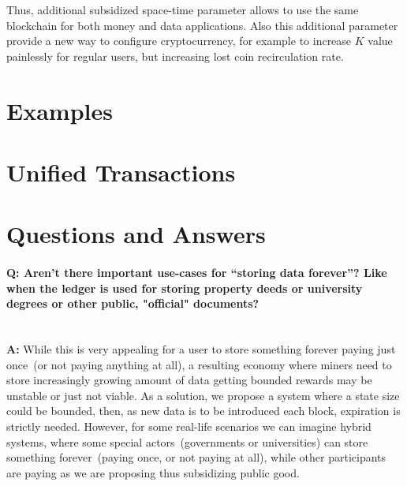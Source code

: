 \documentclass[]{llncs}   %
\newcommand{\authnote}[2]{\marginpar{\parbox{\marginparwidth}{\tiny %
  \textsf{#1 {\textcolor{blue}{notes: #2}}}}}%
  \textcolor{blue}{\textbf{\dag}}}
\newcommand{\authnote}[2]{
  \textsf{#1 \textcolor{blue}{: #2}}}
\newcommand{\authnote}[2]{}
\newcommand{\knote}[1]{{\authnote{\textcolor{green}{Alex notes}}{#1}}}
\begin{document}
Thus, additional subsidized space-time parameter allows to use the same blockchain for both money and data applications. Also this additional parameter provide a new way to configure cryptocurrency, for example to increase $K$ value painlessly for regular users, but increasing lost coin recirculation rate.

\section{Examples}

\knote{moneychain and datachain}

\section{Unified Transactions}

\knote{We can throw away specially coinbase transactions getting unified transaction format, by requiring fees to be paid in form of anyone-can-spend output, and by creating constant rewards in predefined and hard-coded pre-genesis state, where a reward for a certain height is an output in the pre-genesis UTXO spendable only at this height.}

\section{Questions and Answers}


\paragraph{\textbf{Q: } Aren't there important use-cases for ``storing data forever''? Like when the ledger is used for storing property deeds or university degrees or other public, "official" documents?}~\\
\textbf{A: } While this is very appealing for a user to store something forever paying just once~(or not paying anything at all), a resulting economy where miners need to store increasingly growing amount of data getting bounded rewards may be unstable or just not viable. As a solution, we propose a system where a state size could be bounded, then, as new data is to be introduced each block, expiration is strictly needed. However, for some real-life scenarios we can imagine hybrid systems, where some special actors~(governments or universities) can store something forever~(paying once, or not paying at all), while other participants are paying as we are proposing thus subsidizing public good.
\end{document}
